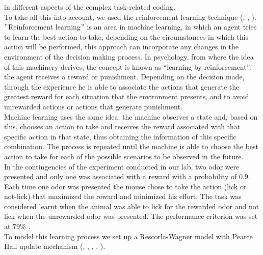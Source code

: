 in different aspects of the complex task-related coding.\\To take all this into account, we used the reinforcement learning technique (\cite{RescorlaWagner}, \cite{Sutton}, \cite{SuttonBarto}).\\$"$Reinforcement learning$"$ is an area in machine learning, in which an agent tries to learn the best action to take, depending on the circumstances in which this action will be performed, this approach can incorporate any changes in the environment of the decision making process. In psychology, from where the idea of this machinery derives, the concept is known as “learning by reinforcement”: the agent receives a reward or punishment. Depending on the decision made, through the experience he is able to associate the actions that generate the greatest reward for each situation that the environment presents, and to avoid unrewarded actions or actions that generate punishment.\\
Machine learning uses the same idea: the machine observes a state and, based on this, chooses an action to take and receives the reward associated with that specific action in that state, thus obtaining the information of this specific combination. The process is repeated until the machine is able to choose the best action to take for each of the possible scenarios to be observed in the future.\\In the contingencies of the experiment conducted in our lab, two odor were presented and only one was associated with a reward with a probability of 0.9. Each time one odor was presented the mouse chose to take the action (lick or not-lick) that maximized the reward and minimized his effort. The task was considered learnt when the animal was able to lick for the rewarded odor and not lick when the unrewarded odor was presented. The performance criterion was set at $79\%$ .\\To model this learning process we set up a Rescorla-Wagner model with Pearce Hall update mechanism (\cite{RescorlaWagner}, \cite{PearceHall}, \cite{Li}, \cite{Costa}, \cite{Koppe}).\\
